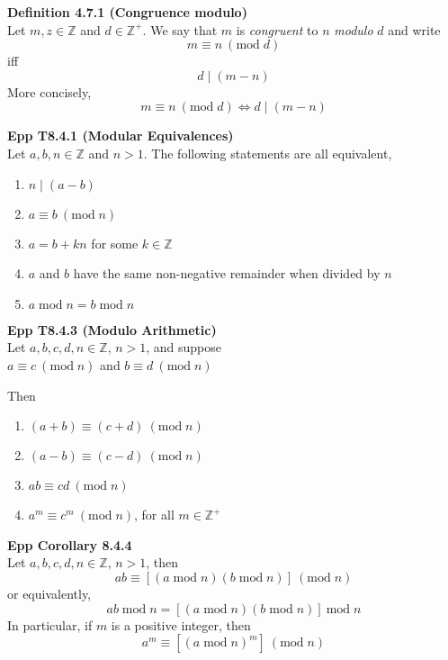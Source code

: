 \documentclass[a4paper]{article}
\newcommand{\subheading}[1]{{\scriptsize\textbf{#1}}}
\begin{document}
\begin{multicols*}{4}

\subheading{Definition 4.7.1 (Congruence modulo)}\\
Let $m, z \in \mathbb{Z}$ and $d \in \mathbb{Z}^+$. We say that $m$ is
\textit{congruent} to $n$ \textit{modulo} $d$ and write
$$ m \equiv n\ (\mathrm{mod}\; d) $$
iff
$$ d\;|\;(m-n) $$
More concisely,
$$ m \equiv n\ (\mathrm{mod}\; d) \iff d\;|\;(m-n) $$

\subheading{Epp T8.4.1 (Modular Equivalences)}\\
Let $a, b, n \in \mathbb{Z}$ and $n > 1$. The following statements are all
equivalent,
\begin{enumerate} \itemsep -0.5em
    \item $n\;|\;(a-b)$
    \item $a \equiv b\ (\mathrm{mod}\; n)$
    \item $a = b + kn$ for some $k \in \mathbb{Z}$
    \item $a$ and $b$ have the same non-negative remainder when divided by $n$
    \item $a\;\mathrm{mod}\;n = b\;\mathrm{mod}\;n$
\end{enumerate}

\subheading{Epp T8.4.3 (Modulo Arithmetic)}\\
Let $a, b, c, d, n \in \mathbb{Z}$, $n > 1$, and suppose\\

{\centering
$a \equiv c\ (\mathrm{mod}\; n)$ and $b \equiv d\ (\textrm{mod}\; n)$\\
}

Then

\begin{enumerate} \itemsep -0.5em
    \item $(a + b) \equiv (c + d)\ (\mathrm{mod}\;n)$
    \item $(a - b) \equiv (c - d)\ (\mathrm{mod}\;n)$
    \item $ab \equiv cd\ (\mathrm{mod}\;n)$
    \item $a^m \equiv c^m\ (\mathrm{mod}\;n)$, for all $m \in \mathbb{Z}^+$
\end{enumerate}

\subheading{Epp Corollary 8.4.4}\\
Let $a, b, c, d, n \in \mathbb{Z}$, $n > 1$, then
$$ ab \equiv [(a\;\mathrm{mod}\;n)(b\;\mathrm{mod}\;n)]\ (\mathrm{mod}\;n) $$
or equivalently,
$$ ab\;\mathrm{mod}\;n = [(a\;\mathrm{mod}\;n)(b\;\mathrm{mod}\;n)]\ \mathrm{mod}\;n $$
In particular, if $m$ is a positive integer, then
$$ a^m \equiv [(a\;\textrm{mod}\;n)^m]\ (\mathrm{mod}\;n) $$


\end{multicols*}
\end{document}
